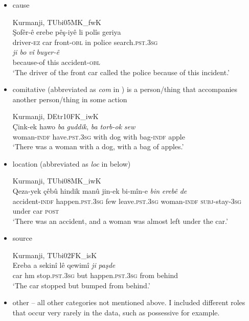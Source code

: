\begin{itemize}
\item cause


\ea \label{ex:key:88} Kurmanji, TUbi05MK\_fwK \\
\gll Şofêr-ê   erebe   pêş-iyê   li   polîs   geriya\\
driver-\textsc{ez}  car  front-\textsc{obl}  in  police  search\textsc{.pst.3sg}\\
\gll \textit{ji bo}     \textit{vî}   \textit{buyer-ê} \\
because-of  this  accident-\textsc{obl}\\
\glt ‘The driver of the front car called the police because of this incident.’ 
  \z


\item comitative (abbreviated as \textit{com} in ) is a person/thing that accompanies another person/thing in some action


\ea \label{ex:key:89} Kurmanji, DEtr10FK\_iwK \\
\gll Çink-ek   hawo     \textit{ba}   \textit{guddik}, \textit{ba}   \textit{torb-ok}   \textit{sew}\\
woman\textsc{-indf}  have\textsc{.pst.3sg}  with  dog   with  bag-\textsc{indf}  apple\\
‘There was a woman with a dog, with a bag of apples.’ 
  \z


\item location (abbreviated as \textit{loc} in  below)

\ea \label{ex:key:90} Kurmanji,  TUbi08MK\_iwK \\
\gll Qeza-yek     çêbû       hindik     manû jin-ek     bi-mîn-e   \textit{bin}   \textit{erebê}   \textit{de}\\
accident-\textsc{indf}    happen\textsc{.pst.3sg}  few    leave\textsc{.pst.3sg} woman-\textsc{indf}  \textsc{subj}-stay-\textsc{3sg}  under  car  \textsc{post}\\
\glt ‘There was an accident, and a woman was almost left under the car.’
  \z


\item source


\ea \label{ex:key:91} Kurmanji, TUbi02FK\_isK \\
\gll Ereba   a  sekinî     lê   qewimî     \textit{ji}   \textit{paşde} \\
car  hm  stop\textsc{.pst.3sg}  but  happen\textsc{.pst.3sg}  from  behind\\
\glt ‘The car stopped but bumped from behind.’ 
  \z

\item other – all other categories not mentioned above. I included different roles that occur very rarely in the data, such as possessive for example.
\end{itemize}

